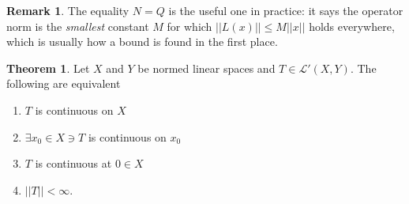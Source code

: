 \documentclass[11pt,a4paper]{article}
\theoremstyle{definition}
\newtheorem{thm}{Theorem}[section]
\newtheorem*{remark}{Remark}
\begin{document}
\begin{remark}
The equality $N=Q$ is the useful one in practice: it says the operator norm is
the \emph{smallest} constant $M$ for which $||L(x)||\leq M||x||$ holds
everywhere, which is usually how a bound is found in the first place.
\end{remark}


\begin{thm}
Let $X$ and $Y$ be normed linear spaces and $T\in \mathcal{L}'(X,Y)$. The following are equivalent
\begin{enumerate}
\item $T$ is continuous on $X$
\item $\exists x_0\in X\ni T$ is continuous on $x_0$
\item $T$ is continuous at $0\in X$
\item $||T||<\infty$.
\end{enumerate}
\end{thm}
\end{document}
